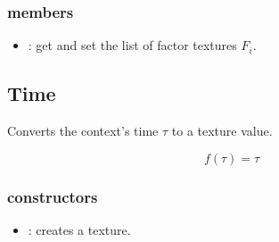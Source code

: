 \subsubsection*{members}
\begin{itemize}
	\item {}:
		get and set the list of factor textures $F_i$.
\end{itemize}



\subsection{Time}

Converts the context's time $\tau$ to a texture value.

\begin{equation}
	f\left(\tau\right) = \tau
\end{equation}

\subsubsection*{constructors}
\begin{itemize}
	\item {}:
		creates a  texture.
\end{itemize}
